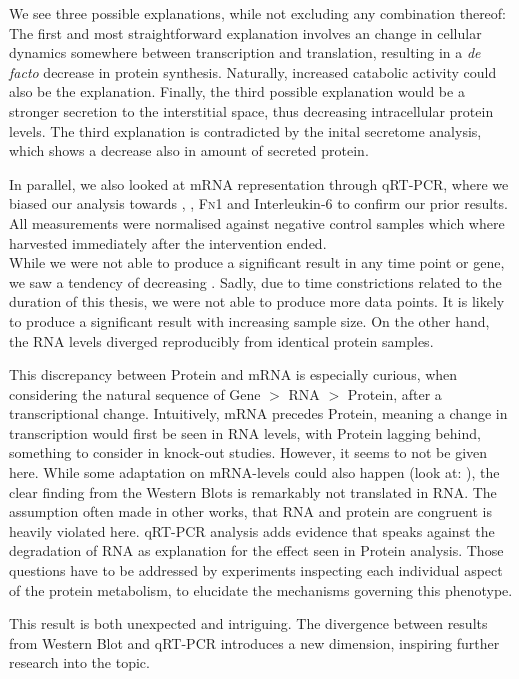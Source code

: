 We see three possible explanations, while not excluding any combination thereof: The first and most straightforward explanation involves an change in cellular dynamics somewhere between transcription and translation, resulting in a \textit{de facto} decrease in protein synthesis. Naturally, increased catabolic activity could also be the explanation. Finally, the third possible explanation would be a stronger secretion to the interstitial space, thus decreasing intracellular protein levels. The third explanation is contradicted by the inital secretome analysis, which shows a decrease also in amount of secreted protein.

In parallel, we also looked at mRNA representation through qRT-PCR, where we biased our analysis towards \colone{ }, \colthree{ }, \textsc{Fn}1 
and Interleukin-6 to confirm our prior results.  All measurements were normalised against negative control samples which where harvested immediately after the intervention ended.\\
While we were not able to produce a significant result in any time point or gene, we saw a tendency of decreasing \colone. Sadly, due to time constrictions related to the duration of this thesis, we were not able to produce more data points. It is likely to produce a significant result with increasing sample size. On the other hand, the RNA levels diverged reproducibly from identical protein samples.

This discrepancy between Protein and mRNA is especially curious, when considering the natural sequence of Gene $>$ RNA $>$ Protein, after a transcriptional change. Intuitively, mRNA precedes Protein, meaning a change in transcription would first be seen in RNA levels, with Protein lagging behind, 
something to consider in knock-out studies. However, it seems to not be given here. While some adaptation on mRNA-levels could also happen (look at:  \colone), the clear finding from the Western Blots is remarkably not translated in RNA. The assumption often made in other works, that RNA and protein are congruent is heavily violated here. qRT-PCR analysis adds evidence that speaks against the degradation of RNA as explanation for the effect seen in Protein analysis. Those questions have to be addressed by experiments inspecting each individual aspect of the protein metabolism, to elucidate the mechanisms governing this phenotype.

This result is both unexpected and intriguing. The divergence between results from Western Blot and qRT-PCR introduces a new dimension, inspiring further research into the topic.

